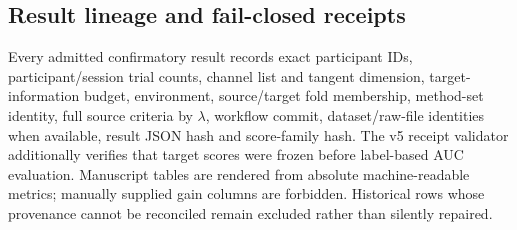 \subsection{Result lineage and fail-closed receipts}
Every admitted confirmatory result records exact participant IDs,
participant/session trial counts, channel list and tangent dimension,
target-information budget, environment, source/target fold membership,
method-set identity, full source criteria by \(\lambda\), workflow commit,
dataset/raw-file identities when available, result JSON hash and score-family
hash. The v5 receipt validator additionally verifies that target scores were
frozen before label-based AUC evaluation. Manuscript tables are rendered from
absolute machine-readable metrics; manually supplied gain columns are
forbidden. Historical rows whose provenance cannot be reconciled remain
excluded rather than silently repaired.
